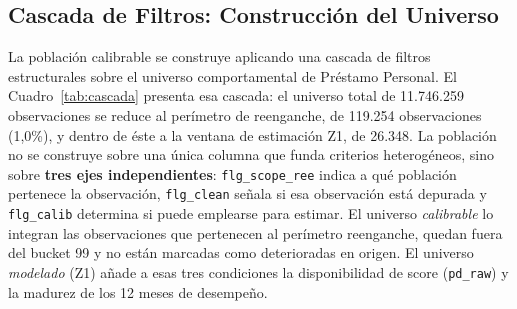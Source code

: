 \documentclass[12pt, a4paper]{article}
\begin{document}
\begin{table}[H]
\centering
\caption{Series de IPC de Lima Metropolitana del BCRP: ticker, magnitud que publica cada una y columna correspondiente en la tabla gobernada.}
\label{tab:tickers}
\small
{}
\end{table}


\subsection{Cascada de Filtros: Construcción del Universo}
\label{sec:cascada}
La población calibrable se construye aplicando una cascada de filtros estructurales sobre el
universo comportamental de Préstamo Personal. El Cuadro~\ref{tab:cascada} presenta esa cascada:
el universo total de 11.746.259 observaciones se reduce al perímetro de reenganche, de 119.254
observaciones (1,0\%), y dentro de éste a la ventana de estimación Z1, de 26.348. La población no
se construye sobre una única columna que funda criterios heterogéneos, sino sobre \textbf{tres
ejes independientes}: \texttt{flg\_scope\_ree} indica a qué población pertenece la observación,
\texttt{flg\_clean} señala si esa observación está depurada y \texttt{flg\_calib} determina si
puede emplearse para estimar. El universo \emph{calibrable} lo integran las observaciones que
pertenecen al perímetro reenganche, quedan fuera del bucket 99 y no están marcadas como
deterioradas en origen. El universo \emph{modelado} (Z1) añade a esas tres condiciones la
disponibilidad de score (\texttt{pd\_raw}) y la madurez de los 12 meses de desempeño.
\end{document}
